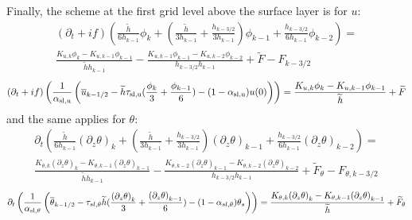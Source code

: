 Finally, the scheme at the first grid level above
the surface layer is for $u$:
\begin{equation}
\label{eq:ND_Ocean_prognosticu_FVfree}
    \begin{aligned}
(\partial_t + if)
	    \left(\frac{\widetilde{h}}{6h_{k-1}} 
    \phi_k
    +
    \left(
	    \frac{\widetilde{h}}{3h_{k-1}} 
	    + \frac{h_{k-3/2}}{3h_{k-1}}
    \right)
	    \phi_{k-1}
	    + \frac{h_{k-3/2}}{6h_{k-1}} \phi_{k-2}\right)
    = \\
	     \frac{K_{u, k} \phi_{k} -
	    K_{u,k-1} \phi_{k-1} }{\widetilde{h}h_{k-1}} -
\frac{K_{u, k-1} \phi_{k-1} - K_{u, k-2} \phi_{k-2}}
	    {h_{k-3/2}h_{k-1}} + \widetilde{F} - F_{k-3/2}
    \end{aligned}
\end{equation}
\begin{equation}
	\label{eq:ND_Ocean_semiDiscreteEkmanEqFVfree}
	(\partial_t+if) \left(\frac{1}{\alpha_{\rm sl, u}}
	\left(\overline{u}_{k-1/2} - \widetilde{h}\tau_{\rm sl, u}
	(\frac{\phi_k}{3} + \frac{\phi_{k-1}}{6}) - 
	(1-\alpha_{\rm sl, u})u(0)\right)\right)
	= \frac{K_{u, k}\phi_{k} - K_{u,k-1} \phi_{k-1}}{\widetilde{h}}
	+ \widetilde{F}
\end{equation}
and the same applies for $\theta$:
\begin{equation}
\label{eq:ND_Ocean_prognosticPT_FVfree}
    \begin{aligned}
\partial_t \left(\frac{\widetilde{h}}{6h_{k-1}} 
	    {(\partial_z \theta)}_k
    +
    \left(
	    \frac{\widetilde{h}}{3h_{k-1}} 
	    + \frac{h_{k-3/2}}{3h_{k-1}}
    \right)
	    {(\partial_z \theta)}_{k-1}
	    + \frac{h_{k-3/2}}{6h_{k-1}} {(\partial_z \theta)}_{k-2}\right)
    = \\
	    \frac{K_{\theta, k} {(\partial_z \theta)}_{k} -
	    K_{\theta, k-1} {(\partial_z \theta)}_{k-1} }{\widetilde{h}h_{k-1}}
	    -\frac{K_{\theta, k-2} {(\partial_z \theta)}_{k-1} -
	    K_{\theta, k-2} {(\partial_z \theta)}_{k-2}}
	    {h_{k-3/2}h_{k-1}} + \widetilde{F}_\theta - F_{\theta, k-3/2}
    \end{aligned}
\end{equation}
\begin{equation}
	\label{eq:ND_Ocean_semiDiscreteEkmanEqPTFVfree}
	\partial_t \left(\frac{1}{\alpha_{\rm sl, \theta}}
	\left(
	\overline{\theta}_{k-1/2} - \tau_{sl, \theta}
	\widetilde{h}(\frac{{(\partial_z \theta)}_k}{3} +
	\frac{{(\partial_z \theta)}_{k-1}}{6})
	 - (1 - \alpha_{sl, \theta})\theta_s
	\right) \right)
	= \frac{K_{\theta, k}{(\partial_z \theta)}_{k} -
	K_{\theta,k-1} {(\partial_z \theta)}_{k-1}}{\widetilde{h}}
	+ \widetilde{F}_\theta 
\end{equation}

